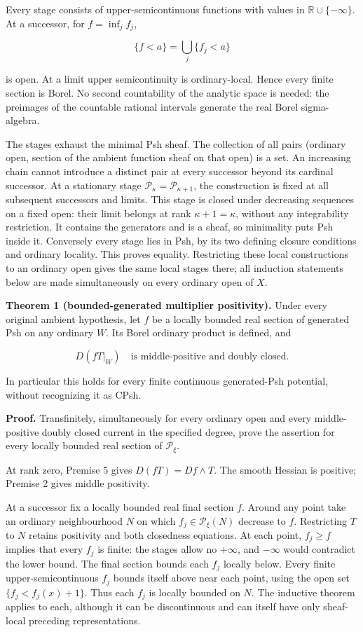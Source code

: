 \documentclass[
  11pt,
]{article}
\begin{document}
Every stage consists of upper-semicontinuous functions with values in
\(\mathbb R\cup\{-\infty\}\). At a successor, for \(f=\inf_j f_j\),

\[\{f<a\}=\bigcup_j\{f_j<a\}\]

is open. At a limit upper semicontinuity is ordinary-local. Hence every
finite section is Borel. No second countability of the analytic space is
needed: the preimages of the countable rational intervals generate the
real Borel sigma-algebra.

The stages exhaust the minimal Psh sheaf. The collection of all pairs
(ordinary open, section of the ambient function sheaf on that open) is a
set. An increasing chain cannot introduce a distinct pair at every
successor beyond its cardinal successor. At a stationary stage
\(\mathcal P_\kappa=\mathcal P_{\kappa+1}\), the construction is fixed
at all subsequent successors and limits. This stage is closed under
decreasing sequences on a fixed open: their limit belongs at rank
\(\kappa+1=\kappa\), without any integrability restriction. It contains
the generators and is a sheaf, so minimality puts Psh inside it.
Conversely every stage lies in Psh, by its two defining closure
conditions and ordinary locality. This proves equality. Restricting
these local constructions to an ordinary open gives the same local
stages there; all induction statements below are made simultaneously on
every ordinary open of \(X\).

\textbf{Theorem 1 (bounded-generated multiplier positivity).} Under
every original ambient hypothesis, let \(f\) be a locally bounded real
section of generated Psh on any ordinary \(W\). Its Borel ordinary
product is defined, and

\[D(fT|_W)\quad\text{is middle-positive and doubly closed}. \tag{5}\]

In particular this holds for every finite continuous generated-Psh
potential, without recognizing it as CPsh.

\textbf{Proof.} Transfinitely, simultaneously for every ordinary open
and every middle-positive doubly closed current in the specified degree,
prove the assertion for every locally bounded real section of
\(\mathcal P_\xi\).

At rank zero, Premise 5 gives \(D(fT)=Df\wedge T\). The smooth Hessian
is positive; Premise 2 gives middle positivity.

At a successor fix a locally bounded real final section \(f\). Around
any point take an ordinary neighbourhood \(N\) on which
\(f_j\in\mathcal P_\xi(N)\) decrease to \(f\). Restricting \(T\) to
\(N\) retains positivity and both closedness equations. At each point,
\(f_j\geq f\) implies that every \(f_j\) is finite: the stages allow no
\(+\infty\), and \(-\infty\) would contradict the lower bound. The final
section bounds each \(f_j\) locally below. Every finite
upper-semicontinuous \(f_j\) bounds itself above near each point, using
the open set \(\{f_j<f_j(x)+1\}\). Thus each \(f_j\) is locally bounded
on \(N\). The inductive theorem applies to each, although it can be
discontinuous and can itself have only sheaf-local preceding
representations.
\end{document}
